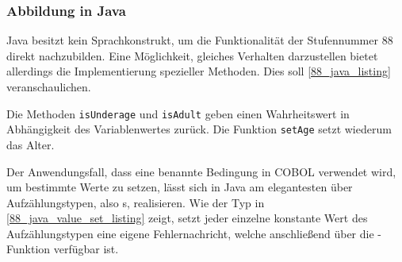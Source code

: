 \subsubsection*{Abbildung in Java}
Java besitzt kein Sprachkonstrukt, um die Funktionalität der Stufennummer 88 direkt nachzubilden. Eine Möglichkeit, gleiches Verhalten darzustellen bietet allerdings die Implementierung spezieller Methoden. Dies soll \autoref{88_java_listing} veranschaulichen.


Die Methoden \texttt{isUnderage} und \texttt{isAdult} geben einen Wahrheitswert in Abhängigkeit des Variablenwertes zurück. Die Funktion \texttt{setAge} setzt wiederum das Alter.


Der Anwendungsfall, dass eine benannte Bedingung in COBOL verwendet wird, um bestimmte Werte zu setzen, lässt sich in Java am elegantesten über Aufzählungstypen, also s, realisieren. Wie der Typ  in \autoref{88_java_value_set_listing} zeigt, setzt jeder einzelne konstante Wert des Aufzählungstypen eine eigene Fehlernachricht, welche anschließend über die -Funktion verfügbar ist.